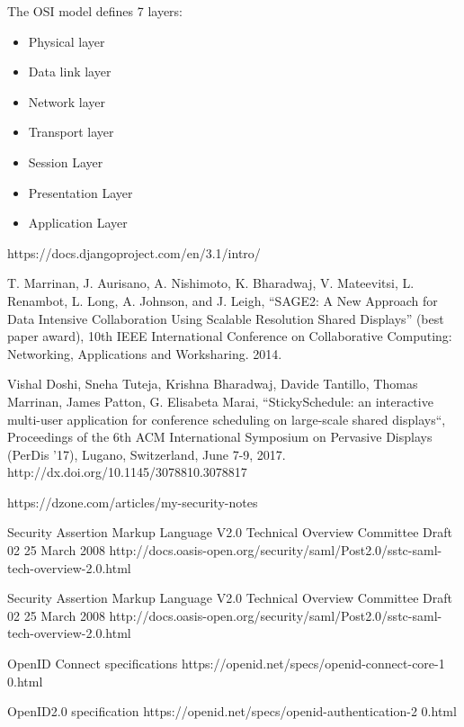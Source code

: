 \documentclass[magisterska,en]{pracamgr}
\begin{document}
The OSI model defines 7 layers:
\begin{itemize}
 \item Physical layer
 \item Data link layer
 \item Network layer
 \item Transport layer
 \item Session Layer
 \item Presentation Layer
 \item Application Layer
\end{itemize}

\begin{thebibliography}{9}

  https://docs.djangoproject.com/en/3.1/intro/
  
  T. Marrinan, J. Aurisano, A. Nishimoto, K. Bharadwaj, V. Mateevitsi, L. Renambot, L. Long, A. Johnson, and J. Leigh, “SAGE2: A New Approach for Data Intensive Collaboration Using Scalable Resolution Shared Displays” (best paper award), 10th IEEE International Conference on Collaborative Computing: Networking, Applications and Worksharing. 2014.
  
  Vishal Doshi, Sneha Tuteja, Krishna Bharadwaj, Davide Tantillo, Thomas Marrinan, James Patton, G. Elisabeta Marai, “StickySchedule: an interactive multi-user application for conference scheduling on large-scale shared displays“, Proceedings of the 6th ACM International Symposium on Pervasive Displays (PerDis ’17), Lugano, Switzerland, June 7-9, 2017. http://dx.doi.org/10.1145/3078810.3078817
  
  
  https://dzone.com/articles/my-security-notes
  
 Security Assertion Markup Language V2.0 Technical Overview
 Committee Draft 02
 25 March 2008
 http://docs.oasis-open.org/security/saml/Post2.0/sstc-saml-tech-overview-2.0.html
 
 Security Assertion Markup Language V2.0 Technical Overview
 Committee Draft 02
 25 March 2008
 http://docs.oasis-open.org/security/saml/Post2.0/sstc-saml-tech-overview-2.0.html
 
 
 OpenID Connect specifications
 https://openid.net/specs/openid-connect-core-1 0.html
 
OpenID2.0 specification
https://openid.net/specs/openid-authentication-2 0.html
 

\end{thebibliography}
\end{document}
